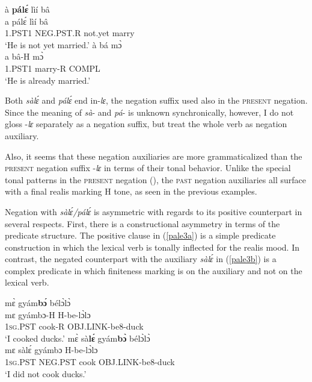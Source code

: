 \begin{exe} 
\ex\label{pale2}
\begin{xlist}
\ex\label{pale2a}
  \glll  à {\bfseries pálɛ́} lìí bâ \\
      a pálɛ́ lìí bâ \\
          1.PST1 NEG.PST.R not.yet marry  \\
    \trans `He is not yet married.'
\ex\label{pale2b}
  \glll  à bá mɔ̀ \\
      a bâ-H mɔ̀ \\
          1.PST1 marry-R COMPL  \\
    \trans `He is already married.'
\end{xlist}
\end{exe}


Both {\itshape sàlɛ́} and {\itshape pálɛ́} end in-{\itshape lɛ}, the negation suffix used also in the \textsc{present} negation. Since the meaning of {\itshape sà}- and {\itshape pá}- is unknown synchronically, however, I do not gloss -{\itshape lɛ} separately as a negation suffix, but treat the whole verb as negation auxiliary.

Also, it seems that these negation auxiliaries are more grammaticalized than the \textsc{present} negation suffix -{\itshape lɛ} in terms of their tonal behavior. Unlike the special tonal patterns in the \textsc{present} negation (), the \textsc{past} negation auxiliaries all surface with a final realis marking H tone, as seen in the previous examples.

Negation with {\itshape sàlɛ́/pálɛ́} is asymmetric with regards to its positive counterpart in several respects. First, there is a constructional asymmetry in terms of the predicate structure. The positive clause in (\ref{pale3a}) is a simple predicate construction in which the lexical verb is tonally inflected for the realis mood. In contrast, the negated counterpart with the auxiliary {\itshape sàlɛ́} in (\ref{pale3b}) is a complex predicate in which finiteness marking is on the auxiliary and not on the lexical verb.

\begin{exe} 
\ex\label{pale3}
\begin{xlist}
\ex\label{pale3a} 
  \glll     mɛ̀ gyám{\bfseries bɔ́} bélɔ̀lɔ̀  \\
          mɛ gyámbɔ-H H-be-lɔ̀lɔ \\
              1\textsc{sg}.PST cook-R OBJ.LINK-be8-duck   \\
    \trans `I cooked ducks.'
\ex\label{pale3b}
  \glll     mɛ̀ sà{\bfseries lɛ́}  gyám{\bfseries bɔ̀} bélɔ̀lɔ̀  \\
            mɛ sàlɛ́  gyámbɔ H-be-lɔ̀lɔ \\
              1\textsc{sg}.PST NEG.PST cook OBJ.LINK-be8-duck   \\
    \trans `I did not cook ducks.'
\end{xlist}
\end{exe}

